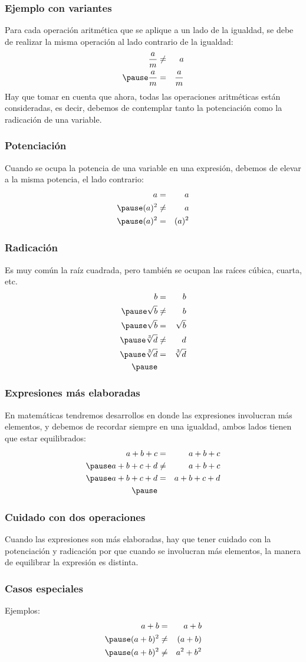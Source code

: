 \begin{frame}
\frametitle{Ejemplo con variantes}
Para cada operación aritmética que se aplique a un lado de la igualdad, se debe de realizar la misma operación al lado contrario de la igualdad:
\begin{eqnarray*}
\dfrac{a}{m} &\neq& a \\ \pause
\dfrac{a}{m} &=& \dfrac{a}{m}
\end{eqnarray*}
\pause
Hay que tomar en cuenta que ahora, todas las operaciones aritméticas están consideradas, es decir, debemos de contemplar tanto la potenciación como la radicación de una variable.
\end{frame}
\begin{frame}
\frametitle{Potenciación}
Cuando se ocupa la potencia de una variable en una expresión, debemos de elevar a la misma potencia, el lado contrario:
\pause
\begin{eqnarray*}
a &=& a \\ \pause
(a)^{2} &\neq& a \\ \pause
(a)^{2} &=& (a)^{2}
\end{eqnarray*}
\end{frame}
\begin{frame}
\frametitle{Radicación}
Es muy común la raíz cuadrada, pero también se ocupan las raíces cúbica, cuarta, etc.
\pause
\begin{eqnarray*}
b &=& b \\ \pause
\sqrt{b} &\neq& b \\ \pause
\sqrt{b} &=& \sqrt{b} \\ \pause
\sqrt[3]{d} &\neq& d \\ \pause
\sqrt[3]{d} &=& \sqrt[3]{d} \\ \pause
\end{eqnarray*}
\end{frame}
\begin{frame}
\frametitle{Expresiones más elaboradas}
En matemáticas tendremos desarrollos en donde las expresiones involucran más elementos, y debemos de recordar siempre en una igualdad, ambos lados tienen que estar equilibrados:
\pause
\begin{eqnarray*}
a + b + c &=& a + b + c \\ \pause
a + b + c + d &\neq& a + b + c \\ \pause
a + b + c + d &=& a + b + c + d \\ \pause
\end{eqnarray*}
\end{frame}
\begin{frame}
\frametitle{Cuidado con dos operaciones}
Cuando las expresiones son más elaboradas, hay que tener cuidado con la potenciación y radicación por que cuando se involucran más elementos, la manera de equilibrar la expresión es distinta.
\end{frame}
\begin{frame}
\frametitle{Casos especiales}
Ejemplos:
\begin{eqnarray*}
a + b &=& a + b \\ \pause
(a + b)^{2} &\neq& (a + b) \\ \pause
(a + b)^{2} &\neq& a^{2} + b^{2}
\end{eqnarray*}
\end{frame}

